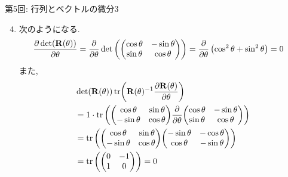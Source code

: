 \documentclass[dvipdfmx,notheorems,t]{beamer}
\begin{document}
\begin{frame}{第5回: 行列とベクトルの微分3}
\begin{enumerate}
  \setcounter{enumi}{3}
  \item 次のようになる.
  {\small \begin{align*}
    \pdv{\det(\vb{R}(\theta))}{\theta}
      &= \pdv{\theta} \det \left( \mqty(\cos \theta & -\sin \theta \\ \sin \theta & \cos \theta) \right)
      = \pdv{\theta} \left( \cos^2 \theta + \sin^2 \theta \right) = 0
  \end{align*}}
  また,
  {\small \begin{align*}
    & \det(\vb{R}(\theta)) \tr(\vb{R}(\theta)^{-1} \pdv{\vb{R}(\theta)}{\theta}) \\
      &= 1 \cdot \tr \left( \mqty(\cos \theta & \sin \theta \\ -\sin \theta & \cos \theta)
        \pdv{\theta} \mqty(\cos \theta & -\sin \theta \\ \sin \theta & \cos \theta) \right) \\
      &= \tr \left( \mqty(\cos \theta & \sin \theta \\ -\sin \theta & \cos \theta)
        \mqty(-\sin \theta & -\cos \theta \\ \cos \theta & -\sin \theta) \right) \\
      &= \tr \left( \mqty(0 & -1 \\ 1 & 0) \right) = 0
  \end{align*}}
\end{enumerate}
\end{frame}
\end{document}
